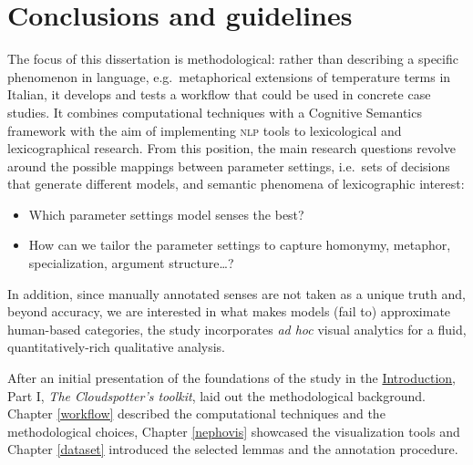\documentclass[
]{book}
\providecommand{\tightlist}{%
  \setlength{\itemsep}{0pt}\setlength{\parskip}{0pt}}
\begin{document}
\hypertarget{conclusions-and-guidelines}{%
\chapter{Conclusions and guidelines}\label{conclusions-and-guidelines}}

The focus of this dissertation is methodological: rather than describing a specific phenomenon in language, e.g.~metaphorical extensions of temperature terms in Italian, it develops and tests a workflow that could be used in concrete case studies. It combines computational techniques with a Cognitive Semantics framework with the aim of implementing \textsc{nlp} tools to lexicological and lexicographical research. From this position, the main research questions revolve around the possible mappings between parameter settings, i.e.~sets of decisions that generate different models, and semantic phenomena of lexicographic interest:

\begin{itemize}
\tightlist
\item
  Which parameter settings model senses the best?
\item
  How can we tailor the parameter settings to capture homonymy, metaphor, specialization, argument structure\ldots?
\end{itemize}

In addition, since manually annotated senses are not taken as a unique truth and, beyond accuracy, we are interested in what makes models (fail to) approximate human-based categories, the study incorporates \emph{ad hoc} visual analytics for a fluid, quantitatively-rich qualitative analysis.

After an initial presentation of the foundations of the study in the \protect\hyperlink{intro}{Introduction}, Part I, \emph{The Cloudspotter's toolkit}, laid out the methodological background. Chapter \ref{workflow} described the computational techniques and the methodological choices, Chapter \ref{nephovis} showcased the visualization tools and Chapter \ref{dataset} introduced the selected lemmas and the annotation procedure.
\end{document}
